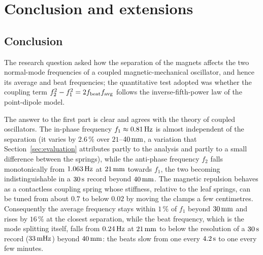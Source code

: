 \section{Conclusion and extensions}

\subsection{Conclusion}

The research question asked how the separation of the magnets affects the two normal-mode frequencies of a coupled magnetic-mechanical oscillator, and hence its average and beat frequencies; the quantitative test adopted was whether the coupling term $f_2^2-f_1^2=2f_{\rm beat}f_{\rm avg}$ follows the inverse-fifth-power law of the point-dipole model.

The answer to the first part is clear and agrees with the theory of coupled oscillators. The in-phase frequency $f_1\approx0.81\,\mathrm{Hz}$ is almost independent of the separation (it varies by $2.6\,\%$ over $21$--$40\,\mathrm{mm}$, a variation that Section~\ref{sec:evaluation} attributes partly to the analysis and partly to a small difference between the springs), while the anti-phase frequency $f_2$ falls monotonically from $1.063\,\mathrm{Hz}$ at $21\,\mathrm{mm}$ towards $f_1$, the two becoming indistinguishable in a $30\,\mathrm{s}$ record beyond $40\,\mathrm{mm}$. The magnetic repulsion behaves as a contactless coupling spring whose stiffness, relative to the leaf springs, can be tuned from about $0.7$ to below $0.02$ by moving the clamps a few centimetres. Consequently the average frequency stays within $1\,\%$ of $f_1$ beyond $30\,\mathrm{mm}$ and rises by $16\,\%$ at the closest separation, while the beat frequency, which is the mode splitting itself, falls from $0.24\,\mathrm{Hz}$ at $21\,\mathrm{mm}$ to below the resolution of a $30\,\mathrm{s}$ record ($33\,\mathrm{mHz}$) beyond $40\,\mathrm{mm}$: the beats slow from one every $4.2\,\mathrm{s}$ to one every few minutes.

